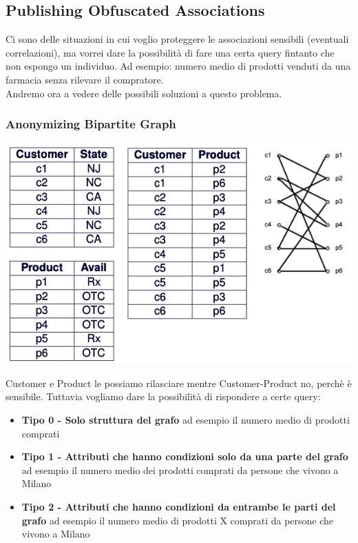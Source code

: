 \subsection{Publishing Obfuscated Associations}
Ci sono delle situazioni in cui voglio proteggere le associazioni sensibili (eventuali correlazioni), ma vorrei dare la possibilità di fare una certa query fintanto che non espongo un individuo. Ad esempio: numero medio di prodotti venduti da una farmacia senza rilevare il compratore.\\Andremo ora a vedere delle possibili soluzioni a questo problema.

\subsubsection{Anonymizing Bipartite Graph}
\begin{center}
    \includegraphics[scale=0.5]{img/AnonGraph.png}
\end{center}
Customer e Product le possiamo rilasciare mentre Customer-Product no, perchè è sensibile. Tuttavia vogliamo dare la possibilità di rispondere a certe query:
\begin{itemize}
    \item \textbf{Tipo 0 - Solo struttura del grafo} ad esempio il numero medio di prodotti comprati
    \item \textbf{Tipo 1 - Attributi che hanno condizioni solo da una parte del grafo} ad esempio il numero medio dei prodotti comprati da persone che vivono a Milano
    \item \textbf{Tipo 2 - Attributi che hanno condizioni da entrambe le parti del grafo} ad esempio il numero medio di prodotti X comprati da persone che vivono a Milano
\end{itemize}
